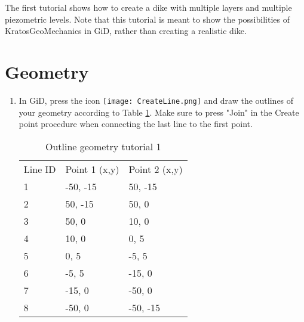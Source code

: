 
The first tutorial shows how to create a dike with multiple layers and multiple piezometric levels. Note that this tutorial is meant to show the possibilities of KratosGeoMechanics in GiD, rather than creating a realistic dike. 
\section{Geometry}	
\begin{enumerate}
	
	
	\item In GiD, press the icon  \texttt{[image: CreateLine.png]} and draw the outlines of your geometry according to Table \ref{tab:tut1_outline}. Make sure to press "Join" in the Create point procedure when connecting the last line to the first point.


	\begin{table}[h!]
		\centering
		\caption{Outline geometry tutorial 1}
		\label{tab:tut1_outline}
		\begin{tabular}{lll}
			Line ID  & Point 1 (x,y)& Point 2 (x,y) \\
			1        & -50, -15     & 50, -15      \\
			2        & 50, -15      & 50, 0        \\
			3        & 50, 0        & 10, 0        \\
			4        & 10, 0        & 0, 5         \\
			5        & 0, 5         & -5, 5        \\
			6        & -5, 5        & -15, 0       \\
			7        & -15, 0       & -50, 0       \\
			8        & -50, 0       & -50, -15     \\
		\end{tabular}
	\end{table}



\end{enumerate}

